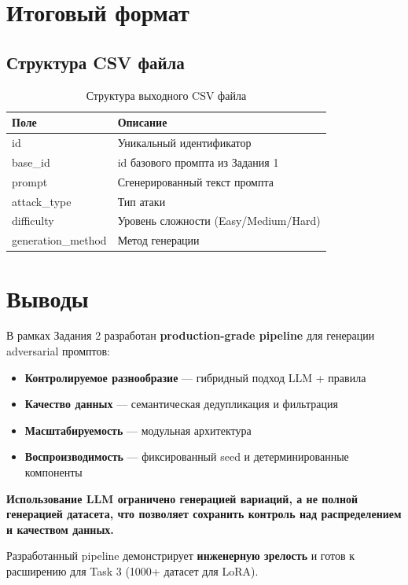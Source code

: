 \documentclass[12pt,a4paper]{article}
\begin{document}
\section{Итоговый формат}

\subsection{Структура CSV файла}
\begin{table}[h]
\centering
\begin{tabular}{@{}ll@{}}
\toprule
Поле & Описание \\
\midrule
id & Уникальный идентификатор \\
base\_id & id базового промпта из Задания 1 \\
prompt & Сгенерированный текст промпта \\
attack\_type & Тип атаки \\
difficulty & Уровень сложности (Easy/Medium/Hard) \\
generation\_method & Метод генерации \\
\bottomrule
\end{tabular}
\caption{Структура выходного CSV файла}
\end{table}

\section{Выводы}

В рамках Задания 2 разработан \textbf{production-grade pipeline} для генерации adversarial промптов:

\begin{itemize}
    \item \textbf{Контролируемое разнообразие} --- гибридный подход LLM + правила
    \item \textbf{Качество данных} --- семантическая дедупликация и фильтрация
    \item \textbf{Масштабируемость} --- модульная архитектура
    \item \textbf{Воспроизводимость} --- фиксированный seed и детерминированные компоненты
\end{itemize}

\textbf{Использование LLM ограничено генерацией вариаций, а не полной генерацией датасета, что позволяет сохранить контроль над распределением и качеством данных.}

Разработанный pipeline демонстрирует \textbf{инженерную зрелость} и готов к расширению для Task 3 (1000+ датасет для LoRA).
\end{document}
